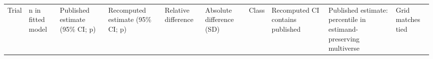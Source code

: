 {\def\LTcaptype{none} %
\begin{longtable}[]{@{}
  >{\raggedright\arraybackslash}p{}
  >{\raggedleft\arraybackslash}p{}
  >{\raggedright\arraybackslash}p{}
  >{\raggedright\arraybackslash}p{}
  >{\raggedleft\arraybackslash}p{}
  >{\raggedleft\arraybackslash}p{}
  >{\raggedright\arraybackslash}p{}
  >{\raggedright\arraybackslash}p{}
  >{\raggedleft\arraybackslash}p{}
  >{\raggedleft\arraybackslash}p{}@{}}
\toprule\noalign{}
\begin{minipage}[b]{\linewidth}\raggedright
Trial
\end{minipage} & \begin{minipage}[b]{\linewidth}\raggedleft
n in fitted model
\end{minipage} & \begin{minipage}[b]{\linewidth}\raggedright
Published estimate (95\% CI; p)
\end{minipage} & \begin{minipage}[b]{\linewidth}\raggedright
Recomputed estimate (95\% CI; p)
\end{minipage} & \begin{minipage}[b]{\linewidth}\raggedleft
Relative difference
\end{minipage} & \begin{minipage}[b]{\linewidth}\raggedleft
Absolute difference (SD)
\end{minipage} & \begin{minipage}[b]{\linewidth}\raggedright
Class
\end{minipage} & \begin{minipage}[b]{\linewidth}\raggedright
Recomputed CI contains published
\end{minipage} & \begin{minipage}[b]{\linewidth}\raggedleft
Published estimate: percentile in estimand-preserving multiverse
\end{minipage} & \begin{minipage}[b]{\linewidth}\raggedleft
Grid matches tied
\end{minipage} \\

\end{longtable}}
